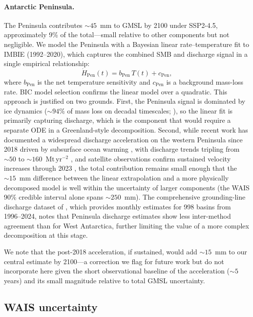 \documentclass[11pt]{article}
\begin{document}
\paragraph{Antarctic Peninsula.}
The Peninsula contributes $\sim\!45$~mm to GMSL by 2100 under SSP2-4.5, approximately 9\% of the total---small relative to other components but not negligible. We model the Peninsula with a Bayesian linear rate--temperature fit to IMBIE (1992--2020), which captures the combined SMB and discharge signal in a single empirical relationship:
\begin{equation}
	\dot{H}_{\mathrm{Pen}}(t) = b_{\mathrm{Pen}}\, T(t) + c_{\mathrm{Pen}},
	\label{eq:peninsula_rate}
\end{equation}
where $b_{\mathrm{Pen}}$ is the net temperature sensitivity and $c_{\mathrm{Pen}}$ is a background mass-loss rate. BIC model selection confirms the linear model over a quadratic. This approach is justified on two grounds. First, the Peninsula signal is dominated by ice dynamics ($\sim\!94\%$ of mass loss on decadal timescales; \citealp{Kim2024}), so the linear fit is primarily capturing discharge, which is the component that would require a separate ODE in a Greenland-style decomposition. Second, while recent work has documented a widespread discharge acceleration on the western Peninsula since 2018 driven by subsurface ocean warming \citep{Davison2024}, with discharge trends tripling from $\sim\!50$ to $\sim\!160$~Mt\,yr$^{-2}$ \citep{Davison2024}, and satellite observations confirm sustained velocity increases through 2023 \citep{Wuite2025, Wallis2023}, the total contribution remains small enough that the $\sim\!15$~mm difference between the linear extrapolation and a more physically decomposed model is well within the uncertainty of larger components (the WAIS 90\% credible interval alone spans $\sim\!250$~mm). The comprehensive grounding-line discharge dataset of \citet{Rignot2025}, which provides monthly estimates for 998 basins from 1996--2024, notes that Peninsula discharge estimates show less inter-method agreement than for West Antarctica, further limiting the value of a more complex decomposition at this stage.

We note that the post-2018 acceleration, if sustained, would add $\sim\!15$~mm to our central estimate by 2100---a correction we flag for future work but do not incorporate here given the short observational baseline of the acceleration ($\sim\!5$ years) and its small magnitude relative to total GMSL uncertainty.

\subsection{WAIS uncertainty}
\label{sec:wais}
\end{document}
